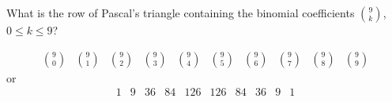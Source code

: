 \documentclass[../main.tex]{subfiles}
\begin{document}
What is the row of Pascal's triangle containing the binomial coefficients $\binom{9}{k}$, $0 \leq k \leq 9$?

\solution
\[
	\begin{matrix}
		\binom{9}{0}
		&
		\binom{9}{1}
		&
		\binom{9}{2}
		&
		\binom{9}{3}
		&
		\binom{9}{4}
		&
		\binom{9}{5}
		&
		\binom{9}{6}
		&
		\binom{9}{7}
		&
		\binom{9}{8}
		&
		\binom{9}{9}
	\end{matrix}
\]
or
\[
	\begin{matrix}1&9&36&84&126&126&84&36&9&1\end{matrix}
\]
\end{document}
